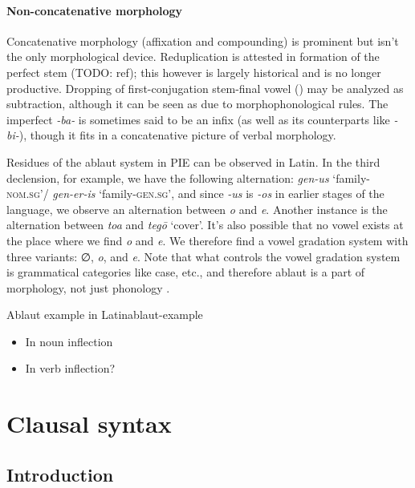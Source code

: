 \documentclass[a4paper, oneside, 12pt]{report}
\newcommand*{\citepage}[1]{p.~{#1}}
\newcommand{\form}[1]{\emph{#1}}
\newcommand*{\category}[1]{\textsc{#1}}
\newcommand{\translate}[1]{`#1'}
\begin{document}
\paragraph*{Non-concatenative morphology}

Concatenative morphology (affixation and compounding) 
is prominent but isn't the only morphological device.
Reduplication is attested in 
formation of the perfect stem (TODO: ref);
this however is largely historical 
and is no longer productive.
Dropping of first-conjugation stem-final vowel ()
may be analyzed as subtraction,
although it can be seen as due to morphophonological rules.
The imperfect \form{-ba-} is sometimes said to be an infix 
(as well as its counterparts like \form{-bi-}),
though it fits in a concatenative picture of verbal morphology.

Residues of the ablaut system in PIE can be observed in Latin.
In the third declension, for example,
we have the following alternation:
\form{gen-us} \translate{family-\category{nom.sg}}/
\form{gen-er-is} \translate{family-\category{gen.sg}},
and since \form{-us} is \form{-os} in earlier stages of the language,
we observe an alternation between \form{o} and \form{e}.
Another instance is the alternation between \form{toa} and \form{teg\={o}} \translate{cover}.
It's also possible that no vowel exists at the place where we find \form{o} and \form{e}.
We therefore find a vowel gradation system with three variants:
∅, \form{o}, and \form{e}.
Note that what controls the vowel gradation system is grammatical categories like case, etc.,
and therefore ablaut is a part of morphology, not just phonology
\citep[\citepage{46}]{weiss2009outline}.

\begin{todobox}{Ablaut example in Latin}{ablaut-example}
    \begin{itemize}
        \item In noun inflection
        \item In verb inflection?
    \end{itemize}
\end{todobox}

\section{Clausal syntax}\label{sec:grammatical.clause}

\subsection{Introduction}
\end{document}
